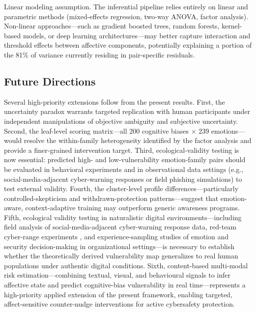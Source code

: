 \documentclass[12pt,a4paper]{article}
\begin{document}
Linear modeling assumption. The inferential pipeline relies entirely on linear and parametric methods (mixed-effects regression, two-way ANOVA, factor analysis). Non-linear approaches---such as gradient boosted trees, random forests, kernel-based models, or deep learning architectures---may better capture interaction and threshold effects between affective components, potentially explaining a portion of the 81\% of variance currently residing in pair-specific residuals.

\newpage
\subsection{Future Directions}

Several high-priority extensions follow from the present results. First, the uncertainty paradox warrants targeted replication with human participants under independent manipulations of objective ambiguity and subjective uncertainty. Second, the leaf-level scoring matrix---all 200 cognitive biases $\times$ 239 emotions---would resolve the within-family heterogeneity identified by the factor analysis and provide a finer-grained intervention target. Third, ecological-validity testing is now essential: predicted high- and low-vulnerability emotion-family pairs should be evaluated in behavioral experiments and in observational data settings (e.g., social-media-adjacent cyber-warning responses or field phishing simulations) to test external validity. Fourth, the cluster-level profile differences---particularly controlled-skepticism and withdrawn-protection patterns---suggest that emotion-aware, context-adaptive training may outperform generic awareness programs. Fifth, ecological validity testing in naturalistic digital environments---including field analysis of social-media-adjacent cyber-warning response data, red-team cyber-range experiments \citep{beltz2025gambit}, and experience-sampling studies of emotion and security decision-making in organizational settings---is necessary to establish whether the theoretically derived vulnerability map generalizes to real human populations under authentic digital conditions. Sixth, content-based multi-modal risk estimation---combining textual, visual, and behavioural signals to infer affective state and predict cognitive-bias vulnerability in real time---represents a high-priority applied extension of the present framework, enabling targeted, affect-sensitive counter-nudge interventions for active cybersafety protection.

\end{document}

